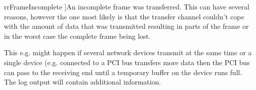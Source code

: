 \begin{Desc}
\begin{description}
{\hypertarget{group___common_interface_ggab6148762ea638f8eabbabfc9468b0d4ca10d87665792fb666a20eda9b076c3164}{rr\+Frame\+Incomplete}\label{group___common_interface_ggab6148762ea638f8eabbabfc9468b0d4ca10d87665792fb666a20eda9b076c3164}
}]An incomplete frame was transferred. This can have several reasons, however the one most likely is that the transfer channel couldn't cope with the amount of data that was transmitted resulting in parts of the frame or in the worst case the complete frame being lost.

This e.\+g. might happen if several network devices transmit at the same time or a single device (e.\+g. connected to a P\+C\+I bus transfers more data then the P\+C\+I bus can pass to the receiving end until a temporary buffer on the device runs full. The log output will contain additional information.


\end{description}
\end{Desc}
